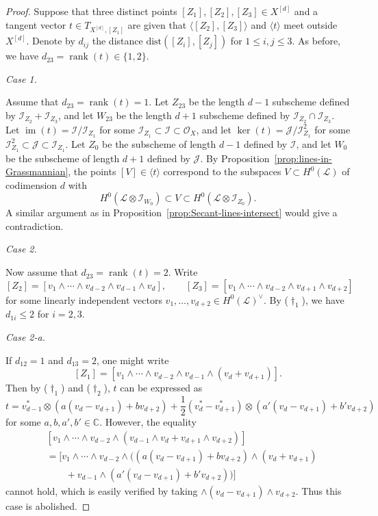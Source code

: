 \documentclass[a4paper]{amsart}
\numberwithin{equation}{section}
\theoremstyle{plain}
\theoremstyle{definition}
\theoremstyle{remark}
\numberwithin{figure}{section}
\numberwithin{table}{section}
\numberwithin{equation}{section}
\def \CC {\mathbb{C}}
\def \Ical {\mathcal{I}}
\def \Jcal {\mathcal{J}}
\def \Lcal {\mathcal{L}}
\def \Ocal {\mathcal{O}}
\DeclareMathOperator{\im}{im}
\DeclareMathOperator{\rank}{rank}
\begin{document}
\begin{proof}

Suppose that three distinct points $[Z_1], [Z_2], [Z_3] \in X^{[d]}$ and a tangent vector $t \in T_{X^{[d]}, [Z_1]}$ are given that $\langle [Z_2], [Z_3] \rangle$ and $\langle t \rangle$ meet outside $X^{[d]}$.
Denote by $d_{ij}$ the distance $\mathrm{dist}([Z_i], [Z_j])$ for $1 \leq i, j \leq 3$.
As before, we have $d_{23} = \rank(t) \in \{ 1,2 \}$.

\hypertarget{Case2-1}{\textit{Case 1.}}
Assume that $d_{23} = \rank(t) = 1$.
Let $Z_{23}$ be the length $d-1$ subscheme defined by $\Ical_{Z_2} + \Ical_{Z_3}$, and let $W_{23}$ be the length $d+1$ subscheme defined by $\Ical_{Z_2} \cap \Ical_{Z_3}$.
Let $\im(t) = \Ical/\Ical_{Z_1}$ for some $\Ical_{Z_1} \subset \Ical \subset \Ocal_X$, and let $\ker(t) = \Jcal/\Ical_{Z_1}^2$ for some $\Ical_{Z_1}^2 \subset \Jcal \subset \Ical_{Z_1}$.
Let $Z_0$ be the subscheme of length $d-1$ defined by $\Ical$, and let $W_0$ be the subscheme of length $d+1$ defined by $\Jcal$.
By Proposition~\ref{prop:lines-in-Grassmannian}, the points $[V] \in \langle t \rangle$ correspond to the subspaces $V \subset H^0(\Lcal)$ of codimension $d$ with
 \[
  H^0(\Lcal \otimes \Ical_{W_0}) \subset V \subset H^0(\Lcal \otimes \Ical_{Z_0}).
 \]
A similar argument as in Proposition~\ref{prop:Secant-lines-intersect} would give a contradiction.

\hypertarget{Case2-2}{\textit{Case 2.}} Now assume that $d_{23} = \rank(t) = 2$.
Write
 \[
  [Z_2] = [v_1 \wedge \cdots \wedge v_{d-2} \wedge v_{d-1} \wedge v_d], \qquad
  [Z_3] = [v_1 \wedge \cdots \wedge v_{d-2} \wedge v_{d+1} \wedge v_{d+2}]
 \]
for some linearly independent vectors $v_1, \dots, v_{d+2} \in H^0(\Lcal)^{\vee}$.
By (\hyperlink{dagger1}{$\dagger_1$}), we have $d_{1i} \leq 2$ for $i = 2,3$.

\hypertarget{Case2-2-a}{\textit{Case 2-a.}} If $d_{12} = 1$ and $d_{13} = 2$, one might write
 \[
  [Z_1] = [v_1 \wedge \cdots \wedge v_{d-2} \wedge v_{d-1} \wedge (v_d + v_{d+1})].
 \]
Then by (\hyperlink{dagger1}{$\dagger_1$}) and (\hyperlink{dagger2}{$\dagger_2$}), $t$ can be expressed as
 \[
  t = v_{d-1}^{\ast} \otimes (a(v_d - v_{d+1}) + bv_{d+2})
    + \frac{1}{2} \left( v_{d}^{\ast} - v_{d+1}^{\ast} \right) \otimes (a'(v_d - v_{d+1}) + b'v_{d+2})
 \]
for some $a,b,a',b' \in \CC$.
However, the equality
 \begin{align*}
  &[v_1 \wedge \cdots \wedge v_{d-2} \wedge (v_{d-1} \wedge v_d + v_{d+1} \wedge v_{d+2})] \\
  &= [v_1 \wedge \cdots \wedge v_{d-2} \wedge ((a(v_d - v_{d+1}) + bv_{d+2}) \wedge (v_d + v_{d+1}) \\
  &\qquad + v_{d-1} \wedge (a'(v_d - v_{d+1}) + b'v_{d+2}))]
 \end{align*}
cannot hold, which is easily verified by taking $\wedge (v_d-v_{d+1}) \wedge v_{d+2}$.
Thus this case is abolished.


\end{proof}
\end{document}
